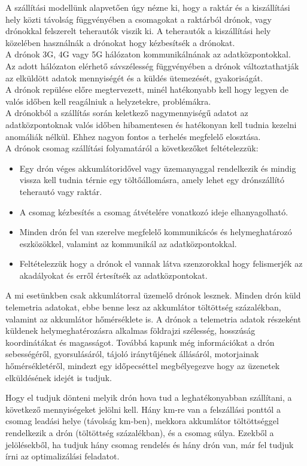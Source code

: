 A szállítási modellünk alapvetően úgy nézne ki, hogy a raktár és a kiszállítási hely közti távolság függvényében a csomagokat a raktárból drónok, vagy drónokkal felszerelt teherautók viszik ki.
A teherautók a kiszállítási hely közelében használnák a drónokat hogy kézbesítsék a drónokat.\\
A drónok 3G, 4G vagy 5G hálózaton kommunikálnának az adatközpontokkal.\\
Az adott hálózaton elérhető sávszélesség függvényében a drónok változtathatják az elküldött adatok mennyiségét és a küldés ütemezését, gyakoriságát.\\
A drónok repülése előre megtervezett, minél hatékonyabb kell hogy legyen de valós időben kell reagálniuk a helyzetekre, problémákra.\\
A drónokból a szállítás során keletkező nagymennyiségű adatot az adatközpontoknak valós időben hibamentesen
és hatékonyan kell tudnia kezelni anomáliák nélkül. Ehhez nagyon fontos a terhelés megfelelő elosztása. \\

A drónok csomag szállítási folyamatáról a következőket feltételezzük:
\begin{itemize}
    \item Egy drón  véges akkumlátoridővel vagy üzemanyaggal rendelkezik és mindig vissza kell tudnia térnie egy töltőállomásra, amely lehet egy drónszállító teherautó vagy raktár.
    \item A csomag kézbesítés a csomag átvételére vonatkozó ideje elhanyagolható.
    \item Minden drón fel van szerelve megfelelő kommunikácós és helymeghatározó eszközökkel, valamint az kommunikál az adatközpontokkal.
    \item Feltételezzük hogy a drónok el vannak látva szenzorokkal hogy felismerjék az akadályokat és erről értesítsék az adatközpontokat.
\end{itemize}
A mi esetünkben csak akkumlátorral üzemelő drónok lesznek. Minden drón küld telemetria adatokat,
ebbe benne lesz az akkumlátor töltöttség százalékban, valamint az akkumlátor hőmérséklete is.
A drónok a telemetria adatok részeként küldenek helymeghatérozásra alkalmas
földrajzi szélesség, hosszúság koordinátákat és magasságot.
Továbbá kapunk még információkat a drón sebességéről,
gyorsulásáról, tájoló iránytűjének állásáról, motorjainak hőmérsékletéről,
mindezt egy időpecséttel megbélyegezve hogy az üzenetek elküldésének idejét is tudjuk.

Hogy el tudjuk dönteni melyik drón hova tud a leghatékonyabban szállítani, a következő mennyiségeket jelölni kell. Hány km-re van a felszállási ponttól a csomag leadási helye (távolság km-ben),
mekkora akkumlátor töltöttséggel rendelkezik a drón (töltöttség százalékban), és a csomag súlya.
Ezekből a jelölésekből, ha tudjuk hány csomag rendelés és hány drón van, már fel tudjuk írni az optimalizálási feladatot.


